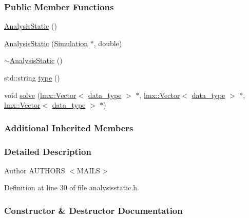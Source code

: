 \subsubsection*{Public Member Functions}
\begin{DoxyCompactItemize}
\item 
\hyperlink{classmknix_1_1_analysis_static_ac64781280792830016fe43f344966f99}{Analysis\+Static} ()
\item 
\hyperlink{classmknix_1_1_analysis_static_a18cfe64c3b4b6b3f54acc3caa6780e92}{Analysis\+Static} (\hyperlink{classmknix_1_1_simulation}{Simulation} $\ast$, double)
\item 
\hyperlink{classmknix_1_1_analysis_static_a67877fe7b967f91b1b8c92cf4afe1658}{$\sim$\+Analysis\+Static} ()
\item 
std\+::string \hyperlink{classmknix_1_1_analysis_static_a14ab31bf7d144b576cbc7ea8de0d4fd9}{type} ()
\item 
void \hyperlink{classmknix_1_1_analysis_static_adf4229a33d4f4c938d9cea19f818d5c8}{solve} (\hyperlink{classlmx_1_1_vector}{lmx\+::\+Vector}$<$ \hyperlink{namespacemknix_a16be4b246fbf2cceb141e3a179111020}{data\+\_\+type} $>$ $\ast$, \hyperlink{classlmx_1_1_vector}{lmx\+::\+Vector}$<$ \hyperlink{namespacemknix_a16be4b246fbf2cceb141e3a179111020}{data\+\_\+type} $>$ $\ast$, \hyperlink{classlmx_1_1_vector}{lmx\+::\+Vector}$<$ \hyperlink{namespacemknix_a16be4b246fbf2cceb141e3a179111020}{data\+\_\+type} $>$ $\ast$)
\end{DoxyCompactItemize}
\subsubsection*{Additional Inherited Members}


\subsubsection{Detailed Description}
\begin{DoxyAuthor}{Author}
A\+U\+T\+H\+O\+R\+S $<$\+M\+A\+I\+L\+S$>$ 
\end{DoxyAuthor}


Definition at line 30 of file analysisstatic.\+h.



\subsubsection{Constructor \& Destructor Documentation}
\hypertarget{classmknix_1_1_analysis_static_ac64781280792830016fe43f344966f99}{}
